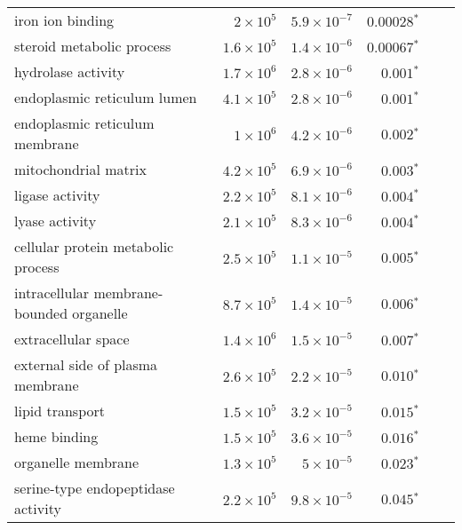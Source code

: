 \begin{longtable}{|l|r|r|r|r|r|}
    iron ion binding                          & $ 2\times 10^{5}$  & $5.9\times 10^{-7}$  & $\bm{0.00028{^*}}$              \\
    steroid metabolic process                 & $1.6\times 10^{5}$ & $1.4\times 10^{-6}$  & $\bm{0.00067{^*}}$              \\
    hydrolase activity                        & $1.7\times 10^{6}$ & $2.8\times 10^{-6}$  & $\bm{ 0.001{^*}}$               \\
    endoplasmic reticulum lumen               & $4.1\times 10^{5}$ & $2.8\times 10^{-6}$  & $\bm{ 0.001{^*}}$               \\
    endoplasmic reticulum membrane            & $ 1\times 10^{6}$  & $4.2\times 10^{-6}$  & $\bm{ 0.002{^*}}$               \\
    mitochondrial matrix                      & $4.2\times 10^{5}$ & $6.9\times 10^{-6}$  & $\bm{ 0.003{^*}}$               \\
    ligase activity                           & $2.2\times 10^{5}$ & $8.1\times 10^{-6}$  & $\bm{ 0.004{^*}}$               \\
    lyase activity                            & $2.1\times 10^{5}$ & $8.3\times 10^{-6}$  & $\bm{ 0.004{^*}}$               \\
    cellular protein metabolic process        & $2.5\times 10^{5}$ & $1.1\times 10^{-5}$  & $\bm{ 0.005{^*}}$               \\
    intracellular membrane-bounded organelle  & $8.7\times 10^{5}$ & $1.4\times 10^{-5}$  & $\bm{ 0.006{^*}}$               \\
    extracellular space                       & $1.4\times 10^{6}$ & $1.5\times 10^{-5}$  & $\bm{ 0.007{^*}}$               \\
    external side of plasma membrane          & $2.6\times 10^{5}$ & $2.2\times 10^{-5}$  & $\bm{ 0.010{^*}}$               \\
    lipid transport                           & $1.5\times 10^{5}$ & $3.2\times 10^{-5}$  & $\bm{ 0.015{^*}}$               \\
    heme binding                              & $1.5\times 10^{5}$ & $3.6\times 10^{-5}$  & $\bm{ 0.016{^*}}$               \\
    organelle membrane                        & $1.3\times 10^{5}$ & $ 5\times 10^{-5}$   & $\bm{ 0.023{^*}}$               \\
    serine-type endopeptidase activity        & $2.2\times 10^{5}$ & $9.8\times 10^{-5}$  & $\bm{ 0.045{^*}}$               \\

\end{longtable}
